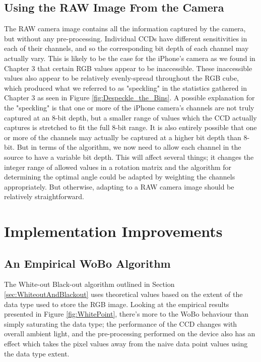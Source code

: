 \subsection{Using the RAW Image From the Camera}\label{sec:UsingTheRAWImageFromTheCamera}
The RAW camera image contains all the information captured by the camera, but without any pre-processing. Individual CCDs have different sensitivities in each of their channels, and so the corresponding bit depth of each channel may actually vary. This is likely to be the case for the iPhone's camera as we found in Chapter 3 that certain RGB values appear to be inaccessible. These inaccessible values also appear to be relatively evenly-spread throughout the RGB cube, which produced what we referred to as "speckling" in the statistics gathered in Chapter 3 as seen in Figure \ref{fig:Despeckle_the_Bins}. 
A possible explanation for the "speckling" is that one or more of the iPhone camera's channels are not truly captured at an 8-bit depth, but a smaller range of values which the CCD actually captures is stretched to fit the full 8-bit range. It is also entirely possible that one or more of the channels may actually be captured at a higher bit depth than 8-bit. But in terms of the algorithm, we now need to allow each channel in the source to have a variable bit depth. This will affect several things; it changes the integer range of allowed values in a rotation matrix and the algorithm for determining the optimal angle could be adapted by weighting the channels appropriately. But otherwise, adapting to a RAW camera image should be relatively straightforward.

\section{Implementation Improvements}\label{sec:ImplementationImprovements}

\subsection{An Empirical WoBo Algorithm}\label{sec:EmpicialWoBoAlgorithm}
The White-out Black-out algorithm outlined in Section \ref{sec:WhiteoutAndBlackout} uses theoretical values based on the extent of the data type used to store the RGB image. Looking at the empirical results presented in Figure \ref{fig:WhitePoint}, there's more to the WoBo behaviour than simply saturating the data type; the performance of the CCD changes with overall ambient light, and the pre-processing performed on the device also has an effect which takes the pixel values away from the naive data point values using the data type extent. 

